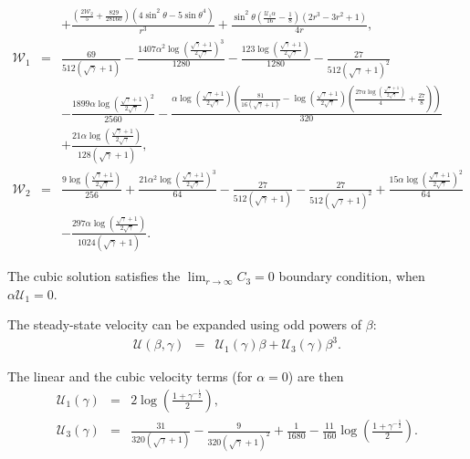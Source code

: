 \documentclass[final]{elsarticle}
\newcommand{\pars}[1]{\left(#1\right)}
\newcommand\cU{\mathscr{U}}
\newcommand\cW{\mathscr{W}}
\begin{document}
\begin{appendix}
\begin{eqnarray*}
\\ && + \frac{\left(\frac{2 {\cW_2}}{5} + \frac{829}{28160}\right) \left(4 {\sin^2\theta} - 5 {\sin\theta}^4\right)}{r^3} + \frac{{\sin^2\theta} \left(\frac{{\cU_1}\alpha}{16} - \frac{1}{8}\right) \left(2 r^3 - 3 r^2 + 1\right)}{4 r},
\\
\cW_1 &=& \frac{69}{512 \left(\sqrt{\gamma} + 1\right)} - \frac{1407\alpha^2 {\log\left(\frac{\sqrt{\gamma} + 1}{2 \sqrt{\gamma}}\right)}^3}{1280} - \frac{123 \log\left(\frac{\sqrt{\gamma} + 1}{2 \sqrt{\gamma}}\right)}{1280} - \frac{27}{512 {\left(\sqrt{\gamma} + 1\right)}^2} \\ && -
\frac{1899\alpha {\log\left(\frac{\sqrt{\gamma} + 1}{2 \sqrt{\gamma}}\right)}^2}{2560} - \frac{\alpha \log\left(\frac{\sqrt{\gamma} + 1}{2 \sqrt{\gamma}}\right) \left(\frac{81}{16 \left(\sqrt{\gamma} + 1\right)} - \log\left(\frac{\sqrt{\gamma} + 1}{2 \sqrt{\gamma}}\right) \left(\frac{27\alpha \log\left(\frac{\sqrt{\gamma} + 1}{2 \sqrt{\gamma}}\right)}{4} + \frac{27}{8}\right)\right)}{320} \\ && + 
\frac{21\alpha \log\left(\frac{\sqrt{\gamma} + 1}{2 \sqrt{\gamma}}\right)}{128 \left(\sqrt{\gamma} + 1\right)},
\\
\cW_2 &=& \frac{9 \log\left(\frac{\sqrt{\gamma} + 1}{2 \sqrt{\gamma}}\right)}{256} + \frac{21\alpha^2 {\log\left(\frac{\sqrt{\gamma} + 1}{2 \sqrt{\gamma}}\right)}^3}{64} - \frac{27}{512 \left(\sqrt{\gamma} + 1\right)} - \frac{27}{512 {\left(\sqrt{\gamma} + 1\right)}^2}
 + \frac{15\alpha {\log\left(\frac{\sqrt{\gamma} + 1}{2 \sqrt{\gamma}}\right)}^2}{64} 
\\ && 
- \frac{297\alpha \log\left(\frac{\sqrt{\gamma} + 1}{2 \sqrt{\gamma}}\right)}{1024 \left(\sqrt{\gamma} + 1\right)}.
\end{eqnarray*}

The cubic solution satisfies the $\lim_{r\rightarrow\infty}C_3 = 0$ boundary condition, 
when $\alpha\cU_1 = 0$.

The steady-state velocity can be expanded using odd powers of $\beta$:
\begin{eqnarray*}
\cU(\beta, \gamma) &=& \cU_1(\gamma) \beta + \cU_3(\gamma) \beta^3.
\end{eqnarray*}

The linear and the cubic velocity terms (for $\alpha = 0$) are then
\begin{eqnarray*}
\cU_1(\gamma) &=& 2 \log \pars{\frac{1 + \gamma^{-\frac{1}{2}}}{2}}, \\
\cU_3(\gamma) &=& \frac{31}{320(\sqrt\gamma + 1)} - \frac{9}{320(\sqrt\gamma + 1)^2} + \frac{1}{1680} - \frac{11}{160} \log \pars{\frac{1 + \gamma^{-\frac{1}{2}}}{2}}.
\end{eqnarray*}


\end{appendix}
\end{document}
